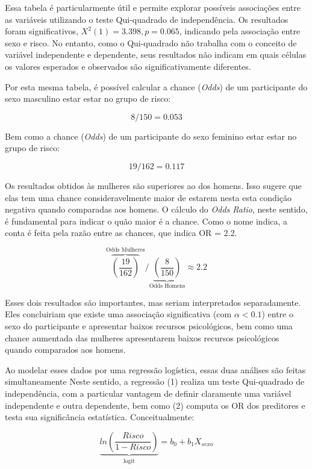 \documentclass[
]{book}
\begin{document}
Essa tabela é particularmente útil e permite explorar possíveis
associações entre as variáveis utilizando o teste Qui-quadrado de
independência. Os resultados foram significativos,
\(X^2(1) = 3.398, p = 0.065\), indicando pela associação entre sexo e
risco. No entanto, como o Qui-quadrado não trabalha com o conceito de
variável independente e dependente, seus resultados não indicam em quais
células os valores esperados e observados são significativamente
diferentes.

Por esta mesma tabela, é possível calcular a chance (\emph{Odds}) de um
participante do sexo masculino estar estar no grupo de risco:

\[8/150 = 0.053\]

Bem como a chance (\emph{Odds}) de um participante do sexo feminino
estar estar no grupo de risco:

\[19/162 = 0.117\]

Os resultados obtidos às mulheres são superiores ao dos homens. Isso
sugere que elas tem uma chance consideravelmente maior de estarem nesta
esta condição negativa quando comparadas aos homens. O cálculo do
\emph{Odds Ratio}, neste sentido, é fundamental para indicar o quão
maior é a chance. Como o nome indica, a conta é feita pela razão entre
as chances, que indica OR = 2.2.

\[{\overbrace{\left ( \frac{19}{162}\right)}^\text{Odds Mulheres}}/{\underbrace{\left ( \frac{8}{150} \right)}_\text{Odds Homens}} \approx 2.2\]

Esses dois resultados são importantes, mas seriam interpretados
separadamente. Eles concluiriam que existe uma associação significativa
(com \(\alpha < 0.1\)) entre o sexo do participante e apresentar baixos
recursos psicológicos, bem como uma chance aumentada das mulheres
apresentarem baixos recursos psicológicos quando comparados aos homens.

Ao modelar esses dados por uma regressão logística, essas duas análises
são feitas simultaneamente Neste sentido, a regressão (1) realiza um
teste Qui-quadrado de independência, com a particular vantagem de
definir claramente uma variável independente e outra dependente, bem
como (2) computa os OR dos preditores e testa sua significância
estatística. Conceitualmente:

\[\underbrace{ln\left ( \frac{Risco}{1-Risco} \right)}_\text{logit} = b_0 + b_1X_{sexo}\]
\end{document}
